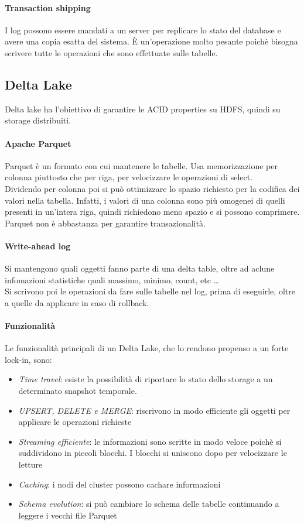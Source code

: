 \paragraph{Transaction shipping}
I log possono essere mandati a un server per replicare lo stato del database e avere
una copia esatta del sistema. È un'operazione molto pesante poichè bisogna scrivere
tutte le operazioni che sono effettuate sulle tabelle.

\subsection{Delta Lake}
Delta lake ha l'obiettivo di garantire le ACID properties su HDFS, quindi su 
storage distribuiti.

\paragraph{Apache Parquet}
Parquet è un formato con cui mantenere le tabelle. Usa memorizzazione 
per colonna piuttosto che per riga, per velocizzare le operazioni di select.\\
Dividendo per colonna poi si può ottimizzare lo spazio richiesto per la codifica
dei valori nella tabella. Infatti, i valori di una colonna sono più omogenei
di quelli presenti in un'intera riga, quindi richiedono meno spazio e si possono
comprimere. Parquet non è abbastanza per garantire transazionalità.

\paragraph{Write-ahead log} 
Si mantengono quali oggetti fanno parte di una delta table, oltre ad 
aclune infomazioni statistiche quali massimo, minimo, count, etc \dots\\
Si scrivono poi le operazioni da fare sulle tabelle nel log, prima di eseguirle, 
oltre a quelle da applicare in caso di rollback.

\paragraph{Funzionalità}
Le funzionalità principali di un Delta Lake, che lo rendono propenso a un forte lock-in, sono:
\begin{itemize}
    \item \emph{Time travel}: esiste la possibilità di riportare lo stato dello storage a un determinato
    snapshot temporale.
    \item \emph{UPSERT, DELETE e MERGE}: riscrivono in modo efficiente gli oggetti per 
    applicare le operazioni richieste
    \item \emph{Streaming efficiente}: le informazioni sono scritte in modo veloce poichè 
    si suddividono in piccoli blocchi. I blocchi si uniscono dopo per velocizzare le letture
    \item \emph{Caching}: i nodi del cluster possono cachare informazioni
    \item \emph{Schema evolution}: si può cambiare lo schema delle tabelle continuando 
    a leggere i vecchi file Parquet 
\end{itemize}

